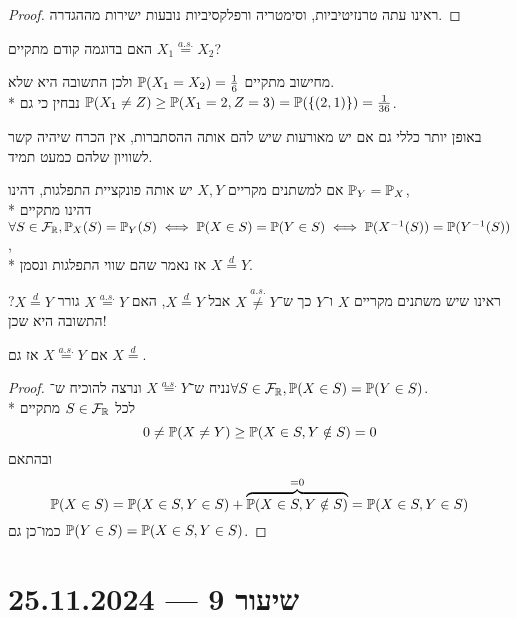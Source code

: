\begin{proof}
	ראינו עתה טרנזיטיביות, וסימטריה ורפלקסיביות נובעות ישירות מההגדרה.
\end{proof}
\begin{exercise}
	האם בדוגמה קודם מתקיים $X_1 \overset{a.s.}{=} X_2$?
\end{exercise}
\begin{solution}
	מחישוב מתקיים $\mathbb{P}(X_1 = X_2) = \frac{1}{6}$ ולכן התשובה היא שלא. \\*
	נבחין כי גם $\mathbb{P}(X_1 \ne Z) \ge \mathbb{P}(X_1 = 2, Z = 3) = \mathbb{P}(\{(2, 1)\}) = \frac{1}{36}$.
\end{solution}
באופן יותר כללי גם אם יש מאורעות שיש להם אותה ההסתברות, אין הכרח שיהיה קשר לשוויון שלהם כמעט תמיד.
\begin{definition}
	אם למשתנים מקריים $X, Y$ יש אותה פונקציית התפלגות, דהינו $\mathbb{P}_Y = \mathbb{P}_X$, \\*
	דהינו מתקיים $\forall S \in \mathcal{F}_{\mathbb{R}}, \mathbb{P}_X(S) = \mathbb{P}_Y(S) \iff \mathbb{P}(X \in S) = \mathbb{P}(Y \in S) \iff \mathbb{P}(X^{-1}(S)) = \mathbb{P}(Y^{-1}(S))$, \\*
	אז נאמר שהם שווי התפלגות ונסמן $X \overset{d}{=} Y$.
\end{definition}
ראינו שיש משתנים מקריים $X$ ו־$Y$ כך ש־$X \overset{a.s.}{\ne} Y$ אבל $X \overset{d}{=} Y$,
האם $X \overset{a.s.}{=} Y$ גורר $X \overset{d}{=} Y$?
התשובה היא שכן!
\begin{proposition}
	אם $X \overset{a.s.}{=} Y$ אז גם $X \overset{d}{=}$.
\end{proposition}
\begin{proof}
	נניח ש־$X \overset{a.s.}{=} Y$ ונרצה להוכיח ש־$\forall S \in \mathcal{F}_{\mathbb{R}}, \mathbb{P}(X \in S) = \mathbb{P}(Y \in S)$. \\*
	לכל $S \in \mathcal{F}_{\mathbb{R}}$ מתקיים
	\[
		0 \ne \mathbb{P}(X \ne Y) \ge \mathbb{P}(X \in S, Y \notin S) = 0
	\]
	ובהתאם
	\[
		\mathbb{P}(X \in S) = \mathbb{P}(X \in S, Y \in S) + \overbrace{\mathbb{P}(X \in S, Y \notin S)}^{= 0} = \mathbb{P}(X \in S, Y \in S)
	\]
	כמו־כן גם $\mathbb{P}(Y \in S) = \mathbb{P}(X \in S, Y \in S)$.
\end{proof}

\section{שיעור 9 --- 25.11.2024}

